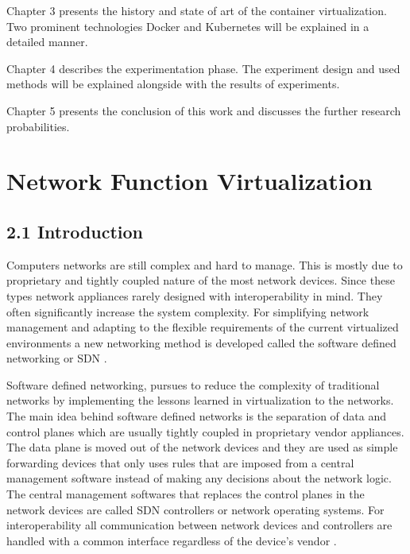 \documentclass[12pt,oneandhalf,chaparabic,ceng,ms,eng,oneside,pntc]{gsufbe}
\begin{document}
Chapter 3 presents the history and state of art of the container virtualization.  Two prominent
technologies Docker and Kubernetes will be explained in a detailed manner.

Chapter 4 describes the experimentation phase.  The experiment design and used methods will be explained
alongside with the results of experiments.

Chapter 5 presents the conclusion of this work and discusses the further research probabilities.


\chapter{Network Function Virtualization}
\section[Introduction]{2.1 Introduction}
Computers networks are still complex and hard to manage.  This is mostly due to proprietary and tightly
coupled nature of the most network devices.  Since these types network appliances rarely designed with
interoperability in mind.  They often significantly increase the system complexity.  For simplifying
network management and adapting to the flexible requirements of the current virtualized environments a
new networking method is developed called the software defined networking or SDN
\cite{chayapathi_network_2016}.

Software defined networking, pursues to reduce the complexity of traditional networks by implementing 
the lessons learned in virtualization to the networks.  The main idea behind software defined networks
is the separation of data and control planes which are usually tightly coupled in proprietary vendor
appliances.  The data plane is moved out of the network devices and they are used as simple forwarding
devices that only uses rules that are imposed from a central management software instead of making any
decisions about the network logic.  The central management softwares that replaces the control planes in
the network devices are called SDN controllers or network operating systems.  For interoperability all
communication between network devices and controllers are handled with a common interface regardless of
the device's vendor \cite{li_software_defined_2015}.
\end{document}
